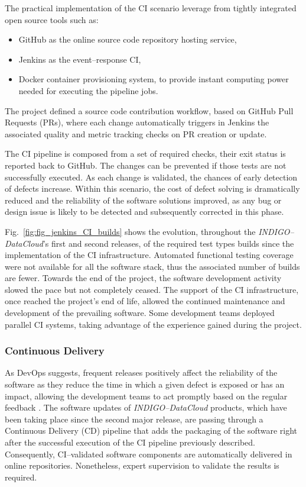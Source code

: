 \documentclass[journal]{IEEEtran}
\begin{document}
The practical implementation of the CI scenario leverage from tightly integrated open
source tools such as:
\begin{itemize}
    \item GitHub \cite{foot9} as the online source code repository hosting service,
    \item Jenkins as the event--response CI,
    \item Docker container provisioning system, to provide instant computing power needed
          for executing the pipeline jobs.
\end{itemize}
The project defined a source code contribution workflow, based on GitHub Pull Requests
(PRs), where each change automatically triggers in Jenkins the associated quality and
metric tracking checks on PR creation or update.

The CI pipeline is composed from a set of required checks, their exit status
is reported back to GitHub. The changes can be prevented if those tests are
not successfully executed.
As each change is validated, the chances
of early detection of defects increase. Within this scenario, the cost of defect solving
is dramatically reduced and the reliability of the software solutions improved, as any
bug or design issue is likely to be detected and subsequently corrected in this phase.

Fig.~\ref{fig:fig_jenkins_CI_builds} shows the evolution, throughout the
{\sl INDIGO--DataCloud}'s first and second releases, of the required test types builds since the
implementation of the CI infrastructure. Automated functional testing coverage were not
available for all the software stack, thus the associated number of builds are fewer.
Towards the end of the project, the software development activity slowed the pace but not completely
ceased. The support of the CI infrastructure, once reached the project's end of life, allowed the
continued maintenance and development of the prevailing software. Some development teams deployed
parallel CI systems, taking advantage of the experience gained during the project.

\subsubsection{Continuous Delivery}
As DevOps suggests, frequent releases positively affect the reliability of the software as
they reduce the time in which a given defect is exposed or has an impact, allowing the
development teams to act promptly based on the regular feedback \cite{chen2015}. The software updates of
{\sl INDIGO--DataCloud} products, which have been taking place since the second major release, are passing through
a Continuous Delivery (CD) pipeline that adds the packaging of the software right after the
successful execution of the CI pipeline previously described. Consequently, CI--validated
software components are automatically delivered in online repositories. Nonetheless,
expert supervision to validate the results is required.
\end{document}

